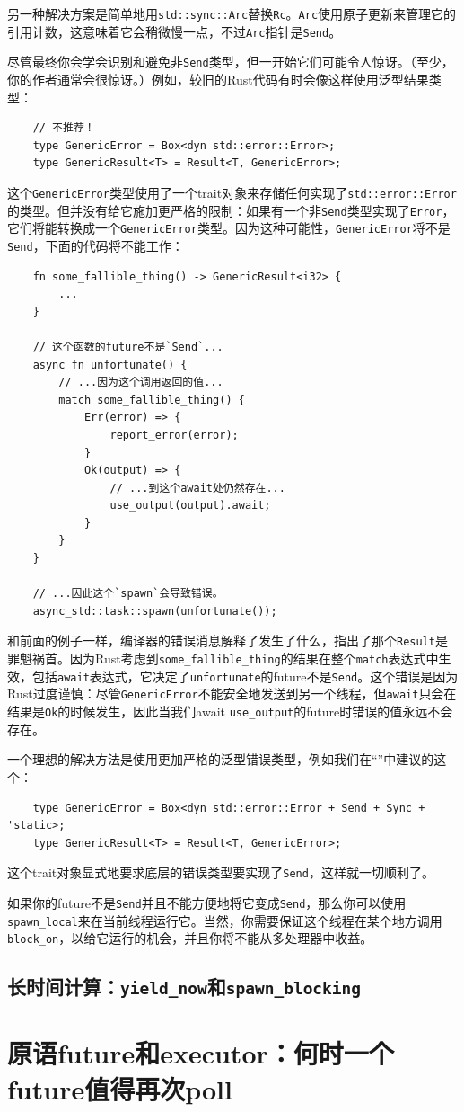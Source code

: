 另一种解决方案是简单地用\texttt{std::sync::Arc}替换\texttt{Rc}。\texttt{Arc}使用原子更新来管理它的引用计数，这意味着它会稍微慢一点，不过\texttt{Arc}指针是\texttt{Send}。

尽管最终你会学会识别和避免非\texttt{Send}类型，但一开始它们可能令人惊讶。（至少，你的作者通常会很惊讶。）例如，较旧的Rust代码有时会像这样使用泛型结果类型：
\begin{verbatim}
    // 不推荐！
    type GenericError = Box<dyn std::error::Error>;
    type GenericResult<T> = Result<T, GenericError>;
\end{verbatim}

这个\texttt{GenericError}类型使用了一个trait对象来存储任何实现了\texttt{std::error::Error}的类型。但并没有给它施加更严格的限制：如果有一个非\texttt{Send}类型实现了\texttt{Error}，它们将能转换成一个\texttt{GenericError}类型。因为这种可能性，\texttt{GenericError}将不是\texttt{Send}，下面的代码将不能工作：
\begin{verbatim}
    fn some_fallible_thing() -> GenericResult<i32> {
        ...
    }

    // 这个函数的future不是`Send`...
    async fn unfortunate() {
        // ...因为这个调用返回的值...
        match some_fallible_thing() {
            Err(error) => {
                report_error(error);
            }
            Ok(output) => {
                // ...到这个await处仍然存在...
                use_output(output).await;
            }
        }
    }

    // ...因此这个`spawn`会导致错误。
    async_std::task::spawn(unfortunate());
\end{verbatim}

和前面的例子一样，编译器的错误消息解释了发生了什么，指出了那个\texttt{Result}是罪魁祸首。因为Rust考虑到\texttt{some\_fallible\_thing}的结果在整个\texttt{match}表达式中生效，包括\texttt{await}表达式，它决定了\texttt{unfortunate}的future不是\texttt{Send}。这个错误是因为Rust过度谨慎：尽管\texttt{GenericError}不能安全地发送到另一个线程，但\texttt{await}只会在结果是\texttt{Ok}的时候发生，因此当我们await \texttt{use\_output}的future时错误的值永远不会存在。

一个理想的解决方法是使用更加严格的泛型错误类型，例如我们在“\nameref{}”中建议的这个：
\begin{verbatim}
    type GenericError = Box<dyn std::error::Error + Send + Sync + 'static>;
    type GenericResult<T> = Result<T, GenericError>;
\end{verbatim}

这个trait对象显式地要求底层的错误类型要实现了\texttt{Send}，这样就一切顺利了。

如果你的future不是\texttt{Send}并且不能方便地将它变成\texttt{Send}，那么你可以使用\texttt{spawn\_local}来在当前线程运行它。当然，你需要保证这个线程在某个地方调用\texttt{block\_on}，以给它运行的机会，并且你将不能从多处理器中收益。

\subsection{长时间计算：\texttt{yield\_now}和\texttt{spawn\_blocking}}\label{LongCompute}

\section{原语future和executor：何时一个future值得再次poll}\label{WhenPoll}

